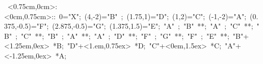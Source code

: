 %




\hbox{
\xy    <0.75cm,0cm>:<0cm,0.75cm>::
       0="X";     (4,-2)="B" ; (1.75,1)="D";  (1,2)="C";   
	   (-1,-2)="A"; (0.375,-0.5)="F"; (2.875,-0.5)="G";  (1.375,1.5)="E"; 
	   "A" ; "B" **\dir{-}; 
       "A" ; "C" **\dir{-}; 
       "B" ; "C" **\dir{-}; 
       "B" ; "A" **\dir{-}; 
       "A" ; "D" **\dir{-}; 
       "F" ; "G" **\dir{-}; 
       "F" ; "E" **\dir{-}; 
       "B"+<1.25em,0ex> *{B};
       "D"+<1.em,0.75ex> *{D};
       "C"+<0em,1.5ex> *{C};
       "A"+<-1.25em,0ex> *{A};
       \endxy}
